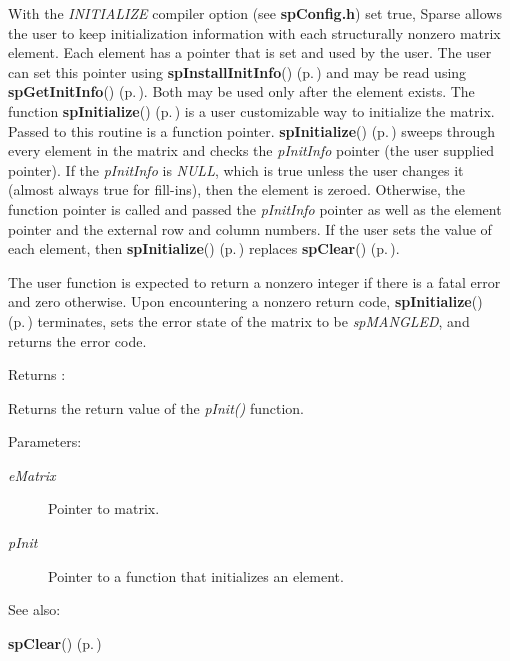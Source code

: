 With the {\em INITIALIZE} compiler option (see {\bf sp\-Config.h}) set true, Sparse allows the user to keep initialization information with each structurally nonzero matrix element. Each element has a pointer that is set and used by the user. The user can set this pointer using {\bf sp\-Install\-Init\-Info}() {\rm (p.\,\pageref{spBuild_8c_a22})} and may be read using {\bf sp\-Get\-Init\-Info}() {\rm (p.\,\pageref{spBuild_8c_a23})}. Both may be used only after the element exists. The function {\bf sp\-Initialize}() {\rm (p.\,\pageref{spBuild_8c_a21})} is a user customizable way to initialize the matrix. Passed to this routine is a function pointer. {\bf sp\-Initialize}() {\rm (p.\,\pageref{spBuild_8c_a21})} sweeps through every element in the matrix and checks the {\em p\-Init\-Info} pointer (the user supplied pointer). If the {\em p\-Init\-Info} is {\em NULL}, which is true unless the user changes it (almost always true for fill-ins), then the element is zeroed. Otherwise, the function pointer is called and passed the {\em p\-Init\-Info} pointer as well as the element pointer and the external row and column numbers. If the user sets the value of each element, then {\bf sp\-Initialize}() {\rm (p.\,\pageref{spBuild_8c_a21})} replaces {\bf sp\-Clear}() {\rm (p.\,\pageref{spBuild_8c_a10})}.

The user function is expected to return a nonzero integer if there is a fatal error and zero otherwise. Upon encountering a nonzero return code, {\bf sp\-Initialize}() {\rm (p.\,\pageref{spBuild_8c_a21})} terminates, sets the error state of the matrix to be {\em sp\-MANGLED}, and returns the error code.

\begin{Desc}
\item[Returns :]\par
 Returns the return value of the {\em p\-Init()} function. \end{Desc}
\begin{Desc}
\item[Parameters: ]\par
\begin{description}
\item[{\em 
e\-Matrix}]Pointer to matrix. \item[{\em 
p\-Init}]Pointer to a function that initializes an element.\end{description}
\end{Desc}
\begin{Desc}
\item[See also: ]\par
{\bf sp\-Clear}() {\rm (p.\,\pageref{spBuild_8c_a10})} \end{Desc}
